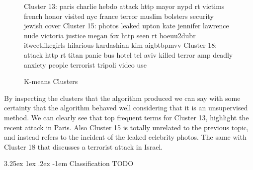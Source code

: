 \documentclass[12pt]{article}
\makeatletter
\renewcommand\paragraph{\@startsection{paragraph}{5}{\z@}%
  {3.25ex \@plus1ex \@minus.2ex}%
  {-1em}%
  {\normalfont\normalsize\bfseries}}
\makeatother
\begin{document}
\begin{figure}[h!]
\begin{footnotesize}
\begin{spverbatim}
Cluster 13:  paris  charlie  hebdo  attack  http  mayor  nypd  
rt  victims  french  honor  visited  nyc  france  terror  muslim 
 bolsters  security  jewish  cover
Cluster 15:  photos  leaked  upton  kate  jennifer  lawrence 
 nude  victoria  justice  megan  fox  http  seen  rt  hoeuu2dubr  
itweetlikegirls  hilarious  kardashian  kim  aigbtbpmvv
Cluster 18: attack http rt titan panic bus hotel tel aviv killed 
terror amp deadly anxiety people terrorist tripoli video use
\end{spverbatim}
\end{footnotesize}
\captionsetup{font=small}
\caption{K-means Clusters}
\label{fig:clusters}
\end{figure}
\hfill \break
By inspecting the clusters that the algorithm produced we can say with some certainty that the algorithm behaved well considering that it is an unsupervised method.
We can clearly see that top frequent terms for Cluster 13, highlight the recent attack in Paris\cite{hebdo}. Also Cluster 15 is totally unrelated to the previous topic, and instead refers to the incident of the leaked celebrity photos\cite{fappening}. The same with Cluster 18 that discusses a terrorist attack in Israel\cite{tel-aviv}.  

\paragraph{Classification} TODO
\hfill \break
\\
\end{document}
